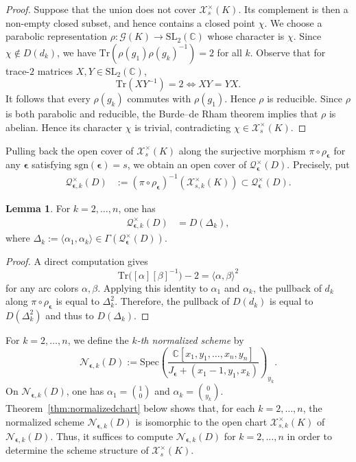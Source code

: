 \documentclass[12pt,reqno]{amsart}
\newcommand{\BC}{\mathbb{C}}
\newcommand{\calN}{\mathcal{N}}
\newcommand{\calQ}{\mathcal{Q}}
\newcommand{\calX}{\mathcal{X}}
\newcommand{\calG}{\mathcal{G}}
\newcommand{\sgn}{\mathrm{sgn}}
\newcommand{\SL}{\mathrm{SL}}
\newcommand{\Tr}{\mathrm{Tr}}
\newcommand{\Spec}{\mathrm{Spec}}
\theoremstyle{definition}
\newtheorem{lemma}[theorem]{Lemma}
\begin{document}
	\begin{proof}
		Suppose that the union does not cover $\calX^\times_s(K)$. Its complement is then a non-empty closed subset, and hence contains a closed point $\chi$. We choose a parabolic representation $\rho : \calG(K) \rightarrow\SL_2(\BC)$ whose character is $\chi$. Since $\chi\notin D(d_k)$, we have 
        $ \Tr ( \rho(g_{1})\rho(g_{k})^{-1}) = 2$ for all $k$. Observe that for trace-$2$ matrices $X,Y\in\SL_2(\BC)$,
		\[
		\Tr(XY^{-1})=2 \Longleftrightarrow XY =YX.
		\]
		It follows that every $\rho(g_{k})$ commutes with $\rho(g_{1})$. Hence $\rho$ is reducible. Since $\rho$ is both parabolic and reducible, the Burde--de Rham theorem implies that $\rho$ is abelian. Hence its character $\chi$ is trivial, contradicting $\chi\in\calX^\times_s(K)$.
	\end{proof}
	Pulling back the open cover of $\calX_s^\times(K)$ along the surjective morphism $\pi\circ\rho_{\boldsymbol{\epsilon}}$ for any $\boldsymbol{\epsilon}$ satisfying $\sgn(\boldsymbol{\epsilon})=s$, we obtain an open cover of $\calQ_{\boldsymbol{\epsilon}}^\times(D)$.  Precisely, put
    \begin{align*}
	\calQ^\times_{\boldsymbol{\epsilon},k}(D) &:= (\pi\circ\rho_{\boldsymbol{\epsilon}})^{-1} (\calX_{s,k}^\times(K))
	\subset \calQ_{\boldsymbol{\epsilon}}^\times(D).
    \end{align*}
	\begin{lemma} \label{lem:pullbackchart}
		For $k=2,\ldots,n$, one has
		\begin{align*}
		\calQ^\times_{{\boldsymbol{\epsilon}},k}(D) &= D(\Delta_k),
		\end{align*}
		where $ \Delta_k:=\langle\alpha_{1},\alpha_{k}\rangle \in \Gamma (\calQ_{\boldsymbol{\epsilon}}^\times(D))$.
	\end{lemma}
	
	\begin{proof}
		A direct computation gives
		$$
		      \Tr\bigl([\alpha][\beta]^{-1}\bigr)-2 = \langle\alpha,\beta\rangle^2
		$$
		for any arc colors $\alpha,\beta$. Applying this identity to $\alpha_{1}$ and $\alpha_{k}$, the pullback of $d_k$ along $\pi \circ \rho_{\boldsymbol{\epsilon}}$ is equal to $\Delta_k^2$.
		Therefore, the pullback of $D(d_k)$ is equal to $D(\Delta_k^2)$ and thus to $D(\Delta_k)$.
	\end{proof}
	
	For $k=2,\ldots,n$, we define the \emph{$k$-th normalized scheme} by
	$$
	\calN_{\boldsymbol{\epsilon},k}(D):= \Spec\left(\frac{\BC[x_1,y_1,\ldots,x_n,y_n]} {J_{\boldsymbol{\epsilon}} +(x_{1}-1,y_{1},x_{k})}\right)_{y_{k}}.
	$$
	On $\calN_{\boldsymbol{\epsilon},k}(D)$, one has $\alpha_{1} = \binom{1}{0}$ and $\alpha_{k} = \binom{0}{y_{k}}$.
    Theorem~\ref{thm:normalizedchart} below shows that, for each $k=2,\ldots,n$, the normalized scheme $\calN_{\boldsymbol{\epsilon},k}(D)$ is isomorphic to the open chart $\calX^\times_{s,k}(K)$ of $\calN_{\boldsymbol{\epsilon},k}(D)$. Thus, it suffices to compute $\calN_{\boldsymbol{\epsilon},k}(D)$ for $k=2,\ldots,n$ in order to determine the scheme structure of $\calX^\times_s(K)$.
\end{document}
